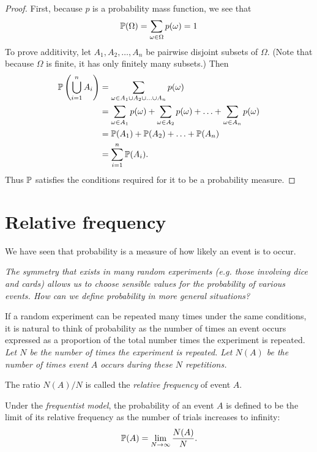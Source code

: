 \newpage

\begin{proof}
First, because $p$ is a probability mass function, we see that
\[
\mathbb{P}(\Omega) = \sum_{\omega\in\Omega}p(\omega) = 1 
\]
To prove additivity, let $A_1,A_2,\ldots,A_n$ be pairwise disjoint subsets of $\Omega$. (Note that because $\Omega$ is finite, it has only finitely many subsets.) Then
\begin{align*}
\mathbb{P}\left(\bigcup_{i=1}^n A_i\right)
	& = \sum_{\omega\in A_1\cup A_2\cup\ldots\cup A_n} p(\omega) \\
	& = \sum_{\omega\in A_1}p(\omega) + \sum_{\omega\in A_2}p(\omega) + \ldots + \sum_{\omega\in A_n}p(\omega) \\
	& = \mathbb{P}(A_1) + \mathbb{P}(A_2) + \ldots +\mathbb{P}(A_n) \\
	& = \sum_{i=1}^n \mathbb{P}(A_i).
\end{align*}
Thus $\mathbb{P}$ satisfies the conditions required for it to be a probability measure.
\end{proof}

\section{Relative frequency}
We have seen that probability is a measure of how likely an event is to occur.

\bit
\it The \emph{symmetry} that exists in many random experiments (e.g. those involving dice and cards) allows us to choose sensible values for the probability of various events.
\it How can we define probability in more general situations?
\eit

If a random experiment can be repeated many times under the same conditions, it is natural to think of probability as the number of times an event occurs expressed as a proportion of the total number times the experiment is repeated.
\bit
\it Let $N$ be the number of times the experiment is repeated. 
\it Let $N(A)$ be the number of times event $A$ occurs during these $N$ repetitions. 
\eit

\begin{definition}
The ratio $N(A)/N$ is called the \emph{relative frequency} of event $A$. 
\end{definition}

\begin{definition}%
Under the \emph{frequentist model}, the probability of an event $A$ is defined to be the limit of its relative frequency as the number of trials increases to infinity:
\[
\mathbb{P}(A) = \lim_{N\to\infty} \frac{N(A)}{N}.
\]
\end{definition}

